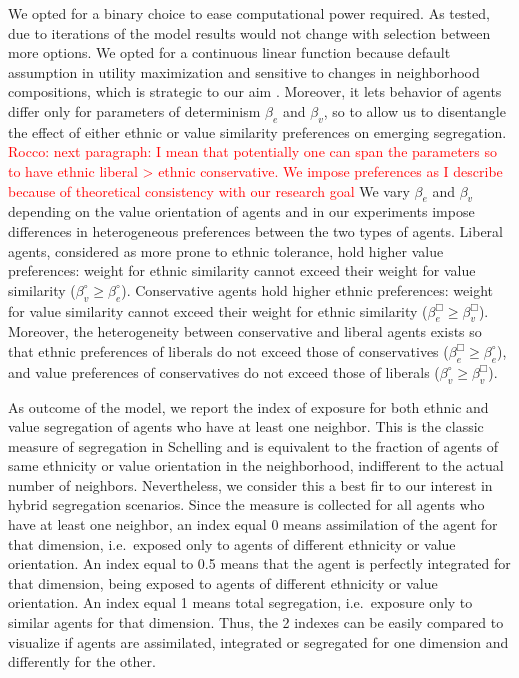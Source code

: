 \documentclass[
]{article}
\begin{document}
We opted for a binary choice to ease computational power required. As
tested, due to iterations of the model results would not change with
selection between more options. We opted for a continuous linear
function because default assumption in utility maximization and
sensitive to changes in neighborhood compositions, which is strategic to
our aim \citep{van2009neighborhood}. Moreover, it lets behavior of
agents differ only for parameters of determinism \(\beta_e\) and
\(\beta_v\), so to allow us to disentangle the effect of either ethnic
or value similarity preferences on emerging segregation.
{\textcolor{red}{Rocco: next paragraph: I mean that potentially one can span the parameters so to have ethnic liberal > ethnic conservative. We impose preferences as I describe because of theoretical consistency with our research goal}}
We vary \(\beta_e\) and \(\beta_v\) depending on the value orientation
of agents and in our experiments impose differences in heterogeneous
preferences between the two types of agents. Liberal agents, considered
as more prone to ethnic tolerance, hold higher value preferences: weight
for ethnic similarity cannot exceed their weight for value similarity
(\(\beta^{\circ}_v \geq \beta^{\circ}_e\)). Conservative agents hold
higher ethnic preferences: weight for value similarity cannot exceed
their weight for ethnic similarity
(\(\beta^{\Box}_e \geq \beta^{\Box}_v\)). Moreover, the heterogeneity
between conservative and liberal agents exists so that ethnic
preferences of liberals do not exceed those of conservatives
(\(\beta^{\Box}_e \geq \beta^{\circ}_e\)), and value preferences of
conservatives do not exceed those of liberals
(\(\beta^{\circ}_v \geq \beta^{\Box}_v\)).

As outcome of the model, we report the index of exposure for both ethnic
and value segregation of agents who have at least one neighbor. This is
the classic measure of segregation in Schelling and is equivalent to the
fraction of agents of same ethnicity or value orientation in the
neighborhood, indifferent to the actual number of neighbors.
Nevertheless, we consider this a best fir to our interest in hybrid
segregation scenarios. Since the measure is collected for all agents who
have at least one neighbor, an index equal 0 means assimilation of the
agent for that dimension, i.e.~exposed only to agents of different
ethnicity or value orientation. An index equal to 0.5 means that the
agent is perfectly integrated for that dimension, being exposed to
agents of different ethnicity or value orientation. An index equal 1
means total segregation, i.e.~exposure only to similar agents for that
dimension. Thus, the 2 indexes can be easily compared to visualize if
agents are assimilated, integrated or segregated for one dimension and
differently for the other.
\end{document}
